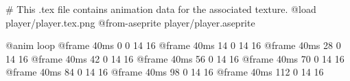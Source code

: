 # This .tex file contains animation data for the associated texture.
@load player/player.tex.png
@from-aseprite player/player.aseprite

@anim loop
	@frame 40ms 0 0 14 16
	@frame 40ms 14 0 14 16
	@frame 40ms 28 0 14 16
	@frame 40ms 42 0 14 16
	@frame 40ms 56 0 14 16
	@frame 40ms 70 0 14 16
	@frame 40ms 84 0 14 16
	@frame 40ms 98 0 14 16
	@frame 40ms 112 0 14 16
